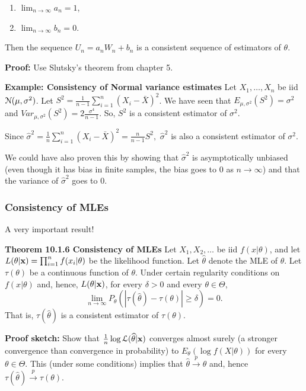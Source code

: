 \documentclass[11pt,]{article}
\newcommand{\Xndots}{X_1, \ldots, X_n}
\def\bx{{\bf x}}
\def\thetahat{{\widehat\theta}}
\def\sigmahat{{\widehat\sigma}}
\def\Xbar{\bar{ X}}
\def\Lsc{{\cal L}}
\def\Nsc{{\cal N}}
\def\sumin{\sum_{i=1}^n}
\begin{document}
\begin{enumerate}
\item $\lim_{n\to\infty} a_n = 1$,
\item $\lim_{n\to\infty} b_n = 0$.
\end{enumerate}

Then the sequence \(U_n = a_n W_n + b_n\) is a consistent sequence of
estimators of \(\theta\).

\noindent\textbf{Proof:} Use Slutsky's theorem from chapter 5.

\noindent\textbf{Example: Consistency of Normal variance estimates} Let
\(\Xndots\) be iid \(\Nsc(\mu,\sigma^2)\). Let
\(S^2 = \frac{1}{n-1} \sumin (X_i - \Xbar)^2\). We have seen that
\(E_{\mu,\sigma^2}(S^2) = \sigma^2\) and
\(Var_{\mu,\sigma^2}(S^2) = 2\frac{\sigma^4}{n-1}\). So, \(S^2\) is a
consistent estimator of \(\sigma^2\).

Since
\(\sigmahat^2 = \frac{1}{n} \sumin(X_i - \Xbar)^2 = \frac{n}{n-1}S^2,\)
\(\sigmahat^2\) is also a consistent estimator of \(\sigma^2\).

We could have also proven this by showing that \(\sigmahat^2\) is
asymptotically unbiased (even though it has bias in finite samples, the
bias goes to 0 as \(n \to \infty\)) and that the variance of
\(\sigmahat^2\) goes to 0.

\hypertarget{consistency-of-mles}{%
\subsubsection{Consistency of MLEs}\label{consistency-of-mles}}

A very important result!

\noindent\textbf{Theorem 10.1.6 Consistency of MLEs} Let
\(X_1, X_2, \ldots\) be iid \(f(x|\theta)\), and let
\(L(\theta|\bx) = \prod_{i=1}^n f(x_i |\theta)\) be the likelihood
function. Let \(\thetahat\) denote the MLE of \(\theta\). Let
\(\tau(\theta)\) be a continuous function of \(\theta\). Under certain
regularity conditions on \(f(x|\theta)\) and, hence, \(L(\theta|\bx)\),
for every \(\delta >0\) and every \(\theta \in \Theta\),
\[\lim_{n\to\infty} P_\theta(|\tau(\thetahat) - \tau(\theta)| \geq \delta) = 0.\]
That is, \(\tau (\thetahat)\) is a consistent estimator of
\(\tau(\theta)\).

\noindent\textbf{Proof sketch:} Show that
\(\frac{1}{n} \log \Lsc(\thetahat | \bx)\) converges almost surely (a
stronger convergence than convergence in probability) to
\(E_\theta(\log f(X|\theta))\) for every \(\theta \in \Theta\). This
(under some conditions) implies that
\(\thetahat \xrightarrow{p} \theta\) and, hence
\(\tau(\thetahat) \xrightarrow{p} \tau(\theta)\).
\end{document}
